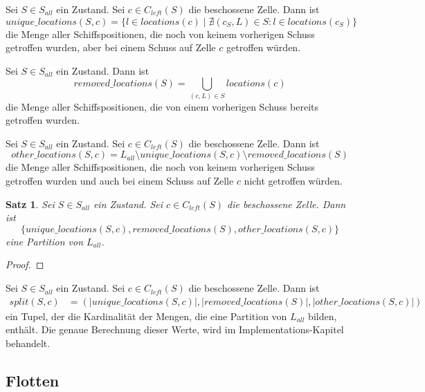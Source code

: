 \documentclass[a4paper,12pt]{llncs}
\numberwithin{equation}{section}
\newtheorem{satz}{Satz}
\begin{document}
\begin{definition}
Sei $S\in S_{all}$ ein Zustand.
Sei $c \in C_{left}(S)$ die beschossene Zelle.
Dann ist
\[
unique\_locations(S, c)=\{l \in locations(c) \mid \nexists (c_S,L) \in S \colon l \in locations(c_S)\}
\]
die Menge aller Schiffspositionen, die noch von keinem vorherigen Schuss getroffen wurden, aber bei einem Schuss auf Zelle $c$ getroffen würden.
\end{definition}

\begin{definition}
Sei $S\in S_{all}$ ein Zustand.
Dann ist
\[
removed\_locations(S)=\bigcup_{(c,L) \in S} locations(c)
\]
die Menge aller Schiffspositionen, die von einem vorherigen Schuss bereits getroffen wurden.
\end{definition}

\begin{definition}
Sei $S\in S_{all}$ ein Zustand.
Sei $c \in C_{left}(S)$ die beschossene Zelle.
Dann ist
\[
other\_locations(S, c)=L_{all} \setminus unique\_locations(S, c) \setminus removed\_locations(S)
\]
die Menge aller Schiffspositionen, die noch von keinem vorherigen Schuss getroffen wurden und auch bei einem Schuss auf Zelle $c$ nicht getroffen würden.
\end{definition}

\begin{satz}
Sei $S\in S_{all}$ ein Zustand.
Sei $c \in C_{left}(S)$ die beschossene Zelle.
Dann ist
\[
\{unique\_locations(S, c), removed\_locations(S), other\_locations(S, c)\}
\]
eine Partition von $L_{all}$.
\end{satz}

\begin{proof}
\end{proof}

\begin{definition}
Sei $S\in S_{all}$ ein Zustand.
Sei $c \in C_{left}(S)$ die beschossene Zelle.
Dann ist
\begin{align}
split(S,c)&=(|unique\_locations(S, c)|, |removed\_locations(S)|, |other\_locations(S, c)|)
\nonumber
\end{align}
ein Tupel, der die Kardinalität der Mengen, die eine Partition von $L_{all}$ bilden, enthält.
Die genaue Berechnung dieser Werte, wird im Implementations-Kapitel behandelt.
\end{definition}


\subsection{Flotten}
\end{document}
